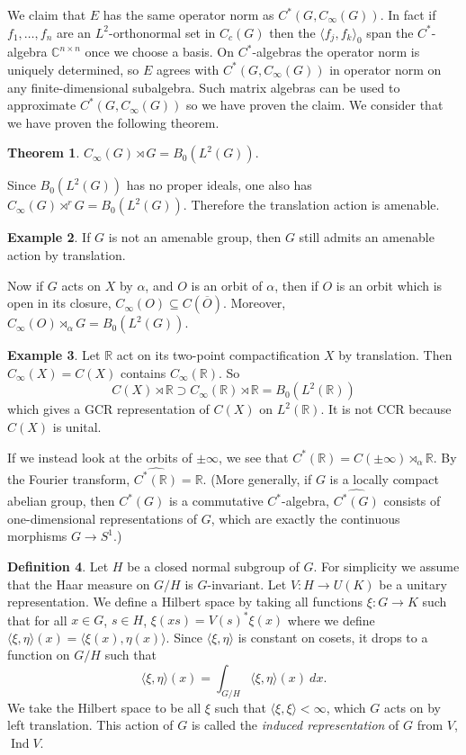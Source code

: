 \documentclass[12pt]{report}
\newcommand{\RR}{\mathbb{R}}
\newcommand{\CC}{\mathbb{C}}
\newcommand{\Ind}{\operatorname{Ind}}
\newcommand{\dfn}[1]{\emph{#1}\index{#1}}
\theoremstyle{definition}
\newtheorem{theorem}{Theorem}[chapter]
\newtheorem{definition}[theorem]{Definition}
\newtheorem{example}[theorem]{Example}
\begin{document}
    We claim that $E$ has the same operator norm as $C^*(G, C_\infty(G))$. In fact if $f_1, \dots, f_n$ are an $L^2$-orthonormal set in $C_c(G)$ then the $\langle f_j, f_k\rangle_0$ span the $C^*$-algebra $\CC^{n \times n}$ once we choose a basis. On $C^*$-algebras the operator norm is uniquely determined, so $E$ agrees with $C^*(G, C_\infty(G))$ in operator norm on any finite-dimensional subalgebra. Such matrix algebras can be used to approximate $C^*(G, C_\infty(G))$ so we have proven the claim. We consider that we have proven the following theorem.
\begin{theorem}
    $C_\infty(G) \rtimes G = B_0(L^2(G))$.
\end{theorem}
    Since $B_0(L^2(G))$ has no proper ideals, one also has $C_\infty(G) \rtimes^r G = B_0(L^2(G))$. Therefore the translation action is amenable.
\begin{example}
    If $G$ is not an amenable group, then $G$ still admits an amenable action by translation.
\end{example}
    Now if $G$ acts on $X$ by $\alpha$, and $O$ is an orbit of $\alpha$, then if $O$ is an orbit which is open in its closure, $C_\infty(O) \subseteq C(\overline O)$. Moreover, $C_\infty(O) \rtimes_\alpha G = B_0(L^2(G))$.
\begin{example}
    Let $\RR$ act on its two-point compactification $X$ by translation. Then $C_\infty(X) = C(X)$ contains $C_\infty(\RR)$. So
    $$C(X) \rtimes \RR \supset C_\infty(\RR) \rtimes \RR = B_0(L^2(\RR))$$
    which gives a GCR representation of $C(X)$ on $L^2(\RR)$. It is not CCR because $C(X)$ is unital.

    If we instead look at the orbits of $\pm \infty$, we see that $C^*(\RR) = C(\pm\infty) \rtimes_\alpha \RR$. By the Fourier transform, $\widehat{C^*(\RR)} = \RR$. (More generally, if $G$ is a locally compact abelian group, then $C^*(G)$ is a commutative $C^*$-algebra, $\widehat{C^*(G)}$ consists of one-dimensional representations of $G$, which are exactly the continuous morphisms $G \to S^1$.)
\end{example}
\begin{definition}
    Let $H$ be a closed normal subgroup of $G$. For simplicity we assume that the Haar measure on $G/H$ is $G$-invariant. Let $V: H \to U(K)$ be a unitary representation. We define a Hilbert space by taking all functions $\xi: G \to K$ such that for all $x \in G$, $s \in H$, $\xi(xs) = V(s)^* \xi(x)$ where we define $\langle \xi, \eta\rangle(x) = \langle \xi(x), \eta(x)\rangle$. Since $\langle \xi, \eta\rangle$ is constant on cosets, it drops to a function on $G/H$ such that
    $$\langle \xi, \eta\rangle(x) = \int_{G/H} \langle \xi, \eta\rangle(x) ~dx.$$
    We take the Hilbert space to be all $\xi$ such that $\langle \xi, \xi\rangle < \infty$, which $G$ acts on by left translation. This action of $G$ is called the \dfn{induced representation} of $G$ from $V$, $\Ind V$.
\end{definition}
\end{document}
